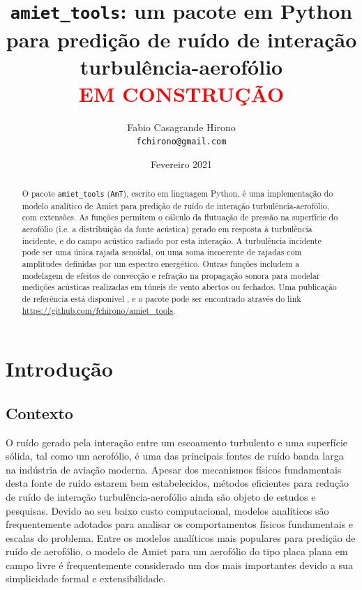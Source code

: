 \documentclass[a4paper, 11pt, twoside]{article}
\author{Fabio Casagrande Hirono \\ \texttt{fchirono@gmail.com}}
\title{\texttt{amiet\_tools}: um pacote em Python para predição de ruído de interação turbulência-aerofólio\\\textcolor{red}{EM CONSTRUÇÃO}}
\date{Fevereiro 2021}
\newcommand{\AmT}{\texttt{AmT}}
\begin{document}
\maketitle

\begin{abstract}
	O pacote \verb|amiet_tools| (\AmT{}), escrito em linguagem Python, é uma implementação do modelo analítico de Amiet \cite{Amiet75} para predição de ruído de interação turbulência-aerofólio, com extensões. As funções permitem o cálculo da flutuação de pressão na superfície do aerofólio (i.e. a distribuição da fonte acústica) gerado em resposta à turbulência incidente, e do campo acústico radiado por esta interação. A turbulência incidente pode ser uma única rajada senoidal, ou uma soma incoerente de rajadas com amplitudes definidas por um espectro energético. Outras funções includem a modelagem de efeitos de convecção e refração na propagação sonora para modelar medições acústicas realizadas em túneis de vento abertos ou fechados. Uma publicação de referência está disponível \cite{Casagrande_etal2020}, e o pacote pode ser encontrado através do link \url{https://github.com/fchirono/amiet_tools}.
\end{abstract}

\section{Introdução}

\subsection{Contexto}

O ruído gerado pela interação entre um escoamento turbulento e uma superfície sólida, tal como um aerofólio, é uma das principais fontes de ruído banda larga na indústria de aviação moderna. Apesar dos mecanismos físicos fundamentais desta fonte de ruído estarem bem estabelecidos, métodos eficientes para redução de ruído de interação turbulência-aerofólio ainda são objeto de estudos e pesquisas. Devido ao seu baixo custo computacional, modelos analíticos são frequentemente adotados para analisar os comportamentos físicos fundamentais e escalas do problema. Entre os modelos analíticos mais populares para predição de ruído de aerofólio, o modelo de Amiet \cite{Amiet75} para um aerofólio do tipo placa plana em campo livre é frequentemente considerado um dos mais importantes devido a sua simplicidade formal e extensibilidade.
\end{document}
